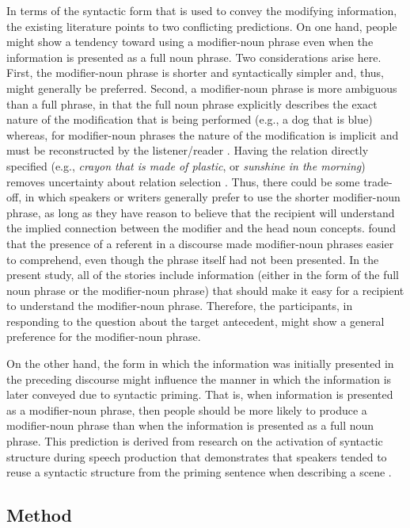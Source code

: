 \documentclass[output=paper]{langsci/langscibook}
\begin{document}
In terms of the syntactic form that is used to convey the modifying
information, the existing literature points to two conflicting
predictions. On one hand, people might show a tendency toward using a
modifier-noun phrase even when the information is presented as a full
noun phrase. Two considerations arise here. First, the modifier-noun
phrase is shorter and syntactically simpler and, thus, might generally
be preferred. Second, a modifier-noun phrase is more ambiguous than a
full phrase, in that the full noun phrase explicitly describes the
exact nature of the modification that is being performed (e.g., a dog
that is blue) whereas, for modifier-noun phrases the nature of the
modification is implicit and must be reconstructed by the
listener/reader \citep{downing1977creation,levi1978syntax}. Having the
relation directly specified (e.g., \textit{crayon that is made of
  plastic}, or \textit{sunshine in the morning}) removes uncertainty
about relation selection
\citep{gagne2014conceptual,gagne2015semantics}. Thus, there could be
some trade-off, in which speakers or writers generally prefer to use
the shorter modifier-noun phrase, as long as they have reason to
believe that the recipient will understand the implied connection
between the modifier and the head noun
concepts. \citet{gagne2004effect} found that the presence of a
referent in a discourse made modifier-noun phrases easier to
comprehend, even though the phrase itself had not been presented. In
the present study, all of the stories include information (either in
the form of the full noun phrase or the modifier-noun phrase) that
should make it easy for a recipient to understand the modifier-noun
phrase. Therefore, the participants, in responding to the question
about the target antecedent, might show a general preference for the
modifier-noun phrase.

On the other hand, the form in which the information was initially
presented in the preceding discourse might influence the manner in
which the information is later conveyed due to syntactic priming. That
is, when information is presented as a modifier-noun phrase, then
people should be more likely to produce a modifier-noun phrase than
when the information is presented as a full noun phrase. This
prediction is derived from research on the activation of syntactic
structure during speech production that demonstrates that speakers
tended to reuse a syntactic structure from the priming sentence when
describing a scene \citep{bock1986syntactic,bock1990framing}.

\subsection{Method}
\end{document}
